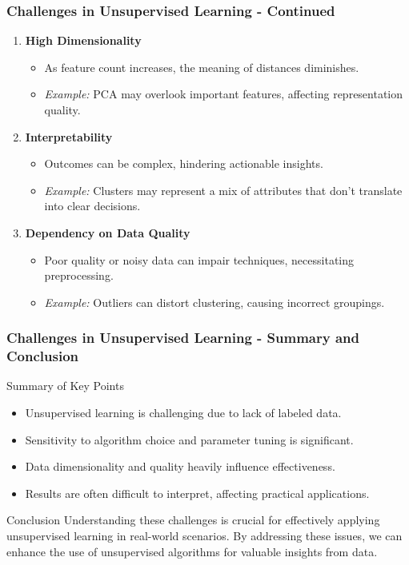\documentclass[aspectratio=169]{beamer}
\begin{document}
\begin{frame}[fragile]
    \frametitle{Challenges in Unsupervised Learning - Continued}
    \begin{enumerate}[resume]
        \item \textbf{High Dimensionality}
            \begin{itemize}
                \item As feature count increases, the meaning of distances diminishes.
                \item \textit{Example:} PCA may overlook important features, affecting representation quality.
            \end{itemize}
            
        \item \textbf{Interpretability}
            \begin{itemize}
                \item Outcomes can be complex, hindering actionable insights.
                \item \textit{Example:} Clusters may represent a mix of attributes that don’t translate into clear decisions.
            \end{itemize}
            
        \item \textbf{Dependency on Data Quality}
            \begin{itemize}
                \item Poor quality or noisy data can impair techniques, necessitating preprocessing.
                \item \textit{Example:} Outliers can distort clustering, causing incorrect groupings.
            \end{itemize}
    \end{enumerate}
\end{frame}

\begin{frame}[fragile]
    \frametitle{Challenges in Unsupervised Learning - Summary and Conclusion}
    \begin{block}{Summary of Key Points}
        \begin{itemize}
            \item Unsupervised learning is challenging due to lack of labeled data.
            \item Sensitivity to algorithm choice and parameter tuning is significant.
            \item Data dimensionality and quality heavily influence effectiveness.
            \item Results are often difficult to interpret, affecting practical applications.
        \end{itemize}
    \end{block}
    \begin{block}{Conclusion}
        Understanding these challenges is crucial for effectively applying unsupervised learning in real-world scenarios. By addressing these issues, we can enhance the use of unsupervised algorithms for valuable insights from data.
    \end{block}
\end{frame}
\end{document}
